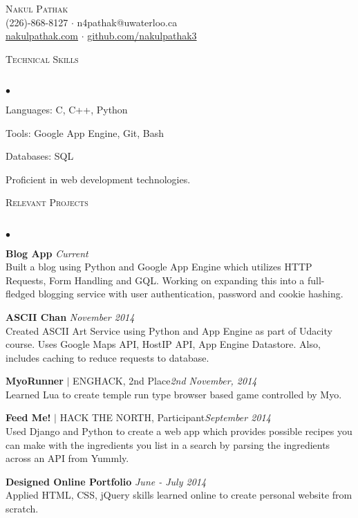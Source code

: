 \documentclass{article}
\newcommand{\lineunder}{\vspace*{-8pt} \\ \hspace*{-18pt} \hrulefill \\}
\newcommand{\header}[1]{{\hspace*{-15pt}\vspace*{6pt} \textsc{#1}} \vspace*{-6pt} \lineunder}
\newenvironment{achievements}{\begin{list}{$\bullet$}{\topsep 0pt \itemsep -1.5pt \leftmargin 5pt}}{\vspace*{4pt}\end{list}}
\begin{document}
\small
\smallskip
\vspace*{-45pt}

\begin{center}
	{\huge \scshape {Nakul Pathak}} \\
\vspace*{6pt} 
(226)-868-8127 $\cdot$ n4pathak@uwaterloo.ca \\
\vspace{1.5pt}
  \url{nakulpathak.com}  $\cdot$ \url{github.com/nakulpathak3}
\end{center}


\vspace{-10pt}
\header{\normalsize Technical Skills}
\begin{achievements}
\item Languages: C, C++, Python
\item Tools: Google App Engine, Git, Bash
\item Databases: SQL
\item Proficient in web development technologies.
\end{achievements}

\vspace{7pt}

\header{\normalsize Relevant Projects}
\begin{achievements}
\item \textbf{Blog App}  \hfill \textit {Current}
\\ Built a blog using Python and Google App Engine which utilizes HTTP Requests, Form Handling and GQL. Working on expanding this into a full-fledged blogging service with user authentication, password and cookie hashing.
\item \textbf{ASCII Chan} \hfill \textit {November 2014}
\\ Created ASCII Art Service using Python and App Engine as part of Udacity course. Uses Google Maps API, HostIP API, App Engine Datastore. Also, includes caching to reduce requests to database. 
\item\textbf{MyoRunner} {$|$ \scriptsize ENGHACK, 2nd Place}\hfill\textit{2nd November, 2014}
\\ Learned Lua to create temple run type browser based game controlled by Myo.
\item \textbf{Feed Me!} {$|$ \scriptsize HACK THE NORTH, Participant}\hfill \textit {September 2014}
\\ Used Django and Python to create a web app which provides possible recipes you can make with the ingredients you list in a search by parsing the ingredients across an API from Yummly.
\item \textbf{Designed Online Portfolio} \hfill \textit {June - July 2014}
\\ Applied HTML, CSS, jQuery skills learned online to create personal website from scratch.
\end{achievements}
\end{document}
